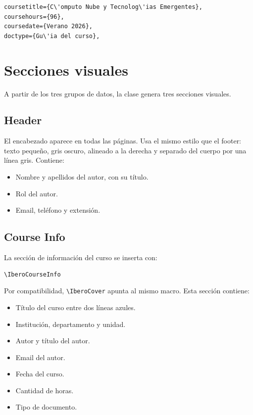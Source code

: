 \documentclass[
  coursetitle={Manual de uso de \texttt{lbustio\_lecture\_notes}},
  coursehours={96},
  coursedate={Verano 2026},
  doctype={Documentaci\'on de la clase},
  otherlangs={english,french},
  authorname={L\'azaro},
  authorsurname={Bustio-Mart\'inez},
  authortitle={PhD},
  role={Profesor Investigador},
  email={lbustio@inaoe.mx},
  phone={5559504000},
  ext={7459},
  institution={Instituto Nacional de Astrof\'isica, \'Optica y Electr\'onica (INAOE)},
  department={Maestr\'ia en Ciencias en Tecnolog\'ias de Seguridad},
  unit={Coordinaci\'on de Ciberseguridad},
  address={Luis Enrique Erro 1, Sta. Ma. Tonantzintla, San Andr\'es Cholula, CP 72840, Puebla, M\'exico},
  margin={0.5in}
]{lbustio_lecture_notes}
\begin{document}
\begin{verbatim}
coursetitle={C\'omputo Nube y Tecnolog\'ias Emergentes},
coursehours={96},
coursedate={Verano 2026},
doctype={Gu\'ia del curso},
\end{verbatim}

\section{Secciones visuales}
A partir de los tres grupos de datos, la clase genera tres secciones visuales.

\subsection{Header}
El encabezado aparece en todas las p\'aginas. Usa el mismo estilo que el footer: texto peque\~no, gris oscuro, alineado a la derecha y separado del cuerpo por una l\'inea gris. Contiene:

\begin{itemize}
  \item Nombre y apellidos del autor, con su t\'itulo.
  \item Rol del autor.
  \item Email, tel\'efono y extensi\'on.
\end{itemize}

\subsection{Course Info}
La secci\'on de informaci\'on del curso se inserta con:

\begin{verbatim}
\IberoCourseInfo
\end{verbatim}

Por compatibilidad, \verb|\IberoCover| apunta al mismo macro. Esta secci\'on contiene:

\begin{itemize}
  \item T\'itulo del curso entre dos l\'ineas azules.
  \item Instituci\'on, departamento y unidad.
  \item Autor y t\'itulo del autor.
  \item Email del autor.
  \item Fecha del curso.
  \item Cantidad de horas.
  \item Tipo de documento.
\end{itemize}
\end{document}
